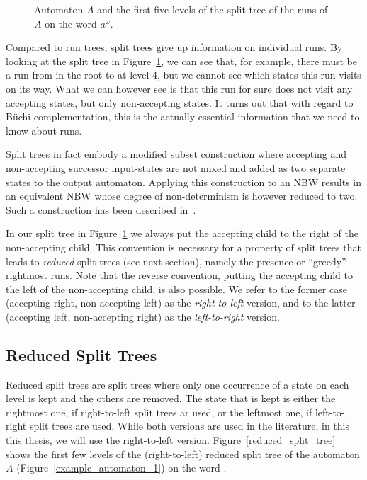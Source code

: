 \begin{figure}
\centering
\SplitTreeRightLeft
\caption{Automaton $A$ and the first five levels of the split tree of the runs of $A$ on the word $a^\omega$.}
\label{split_tree}
\end{figure}

Compared to run trees, split trees give up information on individual runs. By looking at the split tree in Figure~\ref{split_tree}, we can see that, for example, there must be a run from  in the root to  at level 4, but we cannot see which states this run visits on its way. What we can however see is that this run for sure does not visit any accepting states, but only non-accepting states. It turns out that with regard to Büchi complementation, this is the actually essential information that we need to know about runs. 

Split trees in fact embody a modified subset construction where accepting and non-accepting successor input-states are not mixed and added as two separate states to the output automaton. Applying this construction to an NBW results in an equivalent NBW whose degree of non-determinism is however reduced to two. Such a construction has been described in~\cite{UltesNitsche2007107}.

In our split tree in Figure~\ref{split_tree} we always put the accepting child to the right of the non-accepting child. This convention is necessary for a property of split trees that leads to \textit{reduced} split trees (see next section), namely the presence or ``greedy'' rightmost runs. Note that the reverse convention, putting the accepting child to the left of the non-accepting child, is also possible. We refer to the former case (accepting right, non-accepting left) as the \textit{right-to-left} version, and to the latter (accepting left, non-accepting right) as the \textit{left-to-right} version.


\subsection{Reduced Split Trees}
Reduced split trees are split trees where only one occurrence of a state on each level is kept and the others are removed. The state that is kept is either the rightmost one, if right-to-left split trees ar used, or the leftmost one, if left-to-right split trees are used. While both versions are used in the literature, in this this thesis, we will use the right-to-left version. Figure~\ref{reduced_split_tree} shows the first few levels of the (right-to-left) reduced split tree of the automaton $A$ (Figure~\ref{example_automaton_1}) on the word \aom.

